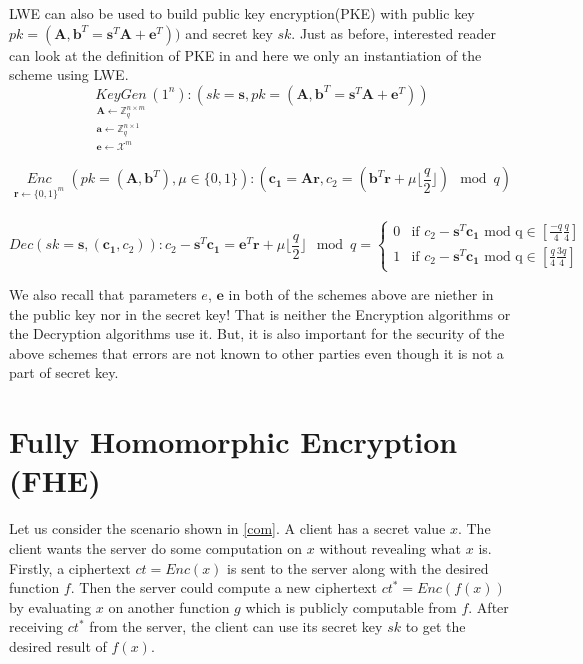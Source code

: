 \documentclass[usletter]{article}
\begin{document}
LWE can also be used to build public key encryption(PKE) with public key $pk = (\pmb{A}, \pmb{b}^T=\pmb{s}^T\pmb{A}+\pmb{e}^T))$ and secret key $sk$. Just as before, interested reader can look at the definition of PKE in  and here we only an instantiation of the scheme using LWE.
$$\underset{\substack{
\pmb{A}\leftarrow\mathbb{Z}_q^{n\times m}\\
\pmb{a}\leftarrow\mathbb{Z}_q^{n\times 1}\\
\pmb{e}\leftarrow\mathcal{X}^m}}{KeyGen}(1^n): (sk=\pmb{s},pk=(\pmb{A}, \pmb{b}^T=\pmb{s}^T\pmb{A}+\pmb{e}^T))$$


$$\underset{\substack{
\pmb{r}\leftarrow\{0,1\}^m\\}}{Enc}(pk = (\pmb{A}, \pmb{b}^T) ,\mu\in\{0,1\}): (\pmb{c_1}=\pmb{A}\pmb{r}, c_2=(\pmb{b}^T\pmb{r}+\mu\lfloor\frac{q}{2}\rfloor)\mod q)$$

$$Dec(sk=\pmb{s},(\pmb{c_1},c_2)): c_2-\pmb{s}^T\pmb{c_1}=\pmb{e}^T\pmb{r}+\mu\lfloor\frac{q}{2}\rfloor \mod q =  \begin{cases}
    0 & \text{if $c_2-\pmb{s}^T\pmb{c_1}$ mod q}  \in [\frac{-q}{4} \frac{q}{4} ] \\%
    1 & \text{if $c_2-\pmb{s}^T\pmb{c_1}$ mod q}  \in [\frac{q}{4} \frac{3q}{4} ]%
  \end{cases}$$
	

\begin{remark}
We also recall that parameters $e$, $\pmb{e}$ in both of the schemes above are niether in the public key nor in the secret key! That is neither the Encryption algorithms or the Decryption algorithms use it. But, it is also important for the security of the above schemes that errors are not known to other parties even though it is not a part of secret key.
\end{remark}

\section{Fully Homomorphic Encryption (FHE)}

Let us consider the scenario shown in \ref{com}. A client has a secret value $x$. The client wants the server do some computation on $x$ without revealing what $x$ is. Firstly, a ciphertext $ct=Enc(x)$ is sent to the server along with the desired function $f$. Then the server could compute a new ciphertext $ct^*=Enc(f(x))$ by evaluating $x$ on another function $g$ which is publicly computable from $f$. After receiving $ct^*$ from the server, the client can use its secret key $sk$ to get the desired result of $f(x)$.
\end{document}

